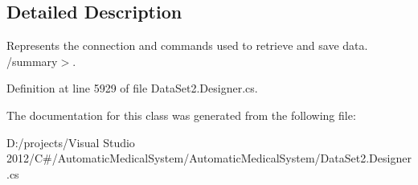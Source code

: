 \subsection{Detailed Description}
Represents the connection and commands used to retrieve and save data. /summary$>$. 

Definition at line 5929 of file DataSet2.Designer.cs.

The documentation for this class was generated from the following file:\begin{CompactItemize}
\item 
D:/projects/Visual Studio 2012/C\#/AutomaticMedicalSystem/AutomaticMedicalSystem/DataSet2.Designer.cs\end{CompactItemize}
